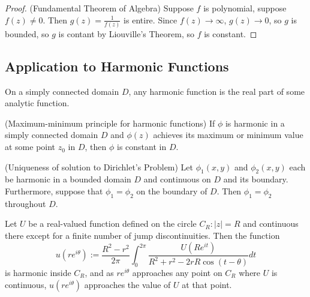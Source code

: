 \begin{proof}(Fundamental Theorem of Algebra)
	Suppose $f$ is polynomial, suppose $f(z)\neq 0$. Then $g(z) = \frac{1}{f(z)}$ is entire. Since $f (z) \to \infty $, $g(z) \to 0$, so $g$ is bounded, so $g$ is contant by Liouville's Theorem, so $f$ is constant.
\end{proof}

\subsection{Application to Harmonic Functions}

\begin{theorem}
	On a simply connected domain $D$, any harmonic function is the real part of some analytic function.
\end{theorem}

\begin{theorem}(Maximum-minimum principle for harmonic functions)
	If $\phi$ is harmonic in a simply connected domain $D$ and $\phi(z)$ achieves its maximum or minimum value at some point $z_0$ in $D$, then $\phi$ is constant in $D$.
\end{theorem}

\begin{theorem}
	(Uniqueness of solution to Dirichlet's Problem)
	Let $\phi_1(x, y)$ and $\phi_2(x, y)$ each be harmonic in a bounded domain $D$ and continuous on $D$ and its boundary. Furthermore, suppose that $\phi_1=\phi_2$ on the boundary of $D$. Then $\phi_1=\phi_2$ throughout $D$.
\end{theorem}

\begin{theorem}
	 Let $U$ be a real-valued function defined on the circle $C_R:|z|=R$ and continuous there except for a finite number of jump discontinuities. Then the function
\[
u\left(r e^{i \theta}\right):=\frac{R^2-r^2}{2 \pi} \int_0^{2 \pi} \frac{U\left(R e^{i t}\right)}{R^2+r^2-2 r R \cos (t-\theta)} d t
\]
is harmonic inside $C_R$, and as $r e^{i \theta}$ approaches any point on $C_R$ where $U$ is continuous, $u\left(r e^{i \theta}\right)$ approaches the value of $U$ at that point.
\end{theorem}

